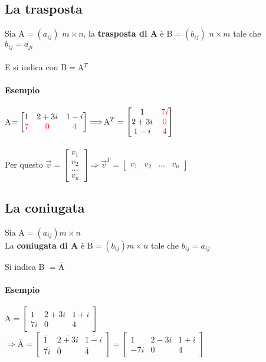 \subsection{La trasposta}
Sia A$=(a_{ij})$ $m\times n$, la \textbf{trasposta di A} è B$=(b_{ij})$ $n\times m$ tale che \\

$b_{ij}=a_{ji}$\\\\
E si indica con B$=$A$^T$

\paragraph{Esempio}  A$=
\begin{bmatrix}
    1 & 2+3i & 1-i \\
    {\color{red} 7} & {\color{red}0} & {\color{red}4}
\end{bmatrix}
\Longrightarrow
$A$^{T}=
\begin{bmatrix}
    1 & {\color{red}7i}\\
    2+3i & {\color{red}0}\\
    1-i & {\color{red}4}
\end{bmatrix}
$\\\\
Per questo $\vec{v}=
\begin{bmatrix}
    v_1 \\ v_2 \\ ...\\v_n
\end{bmatrix}
\Longrightarrow
\vec{v}^T=
\begin{bmatrix}
    v_1 & v_2 & ... & v_n
\end{bmatrix}
$
\subsection{La coniugata}
Sia A$=(a_{ij})m\times n$\\
La \textbf{coniugata di A} è B$=(b_{ij})m\times n$ tale che $b_{ij}=a_{ij}$
\begin{center}
    Si indica B $= \overline{\textrm{A}}$
\end{center}
\paragraph{Esempio} 
A$=
\begin{bmatrix} 
    1 & 2+3i & 1+i\\
    7i & 0 & 4
\end{bmatrix}$\\ 
$
\Longrightarrow
\overline{\textrm{A}}=
\begin{bmatrix}
    \overline{1} & \overline{2+3i} & \overline{1-i}\\
    \overline{7i} & \overline{0} & \overline{4}
\end{bmatrix}=
\begin{bmatrix}
    {1} & {2-3i} & {1+i}\\
    {-7i} & {0} & {4}
\end{bmatrix}
$
